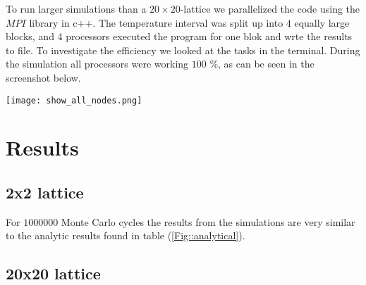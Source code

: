 \documentclass[11pt]{article}
\begin{document}
\begin{flushleft}
To run larger simulations than a $20 \times 20$-lattice we parallelized the code using the $MPI$ library in c++. The temperature interval was split up into $4$ equally large blocks, and 4 processors executed the program for one blok and wrte the results to file. To investigate the efficiency we looked at the tasks in the terminal. During the simulation all processors were working $100$ \%, as can be seen in the screenshot below.

\texttt{[image: show\_all\_nodes.png]}\label{efficiency}

\end{flushleft}

\section*{Results}

\subsection*{2x2 lattice}

\begin{flushleft}
For $1000000$ Monte Carlo cycles the results from the simulations are very similar to the analytic results found in table (\ref{Fig::analytical}). 
\end{flushleft}



\subsection*{20x20 lattice}
\end{document}
